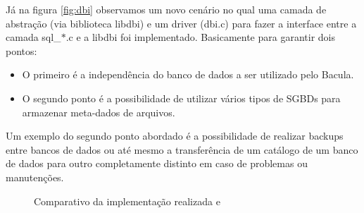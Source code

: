 Já na figura \ref{fig:dbi} observamos um novo cenário no qual uma camada de abstração (via biblioteca libdbi) e um driver (dbi.c) para fazer a interface entre a camada sql\_$\ast$.c e a libdbi foi implementado. Basicamente para garantir dois pontos: 
\begin{itemize}
\item O primeiro é a independência do banco de dados a ser utilizado pelo Bacula. 
\item O segundo ponto é a possibilidade de utilizar vários tipos de SGBDs para armazenar meta-dados de arquivos.                                                                   \end{itemize}
Um exemplo do segundo ponto abordado é a possibilidade de realizar backups entre bancos de dados ou até mesmo a transferência de um catálogo de um banco de dados para outro completamente distinto em caso de problemas ou manutenções.

\begin{figure}[h]
 \centerline{
  \hfil
  \label{fig:comparativo}
 }  
 \caption[Comparativo de implementação]{Comparativo da implementação realizada  e }
\end{figure}

